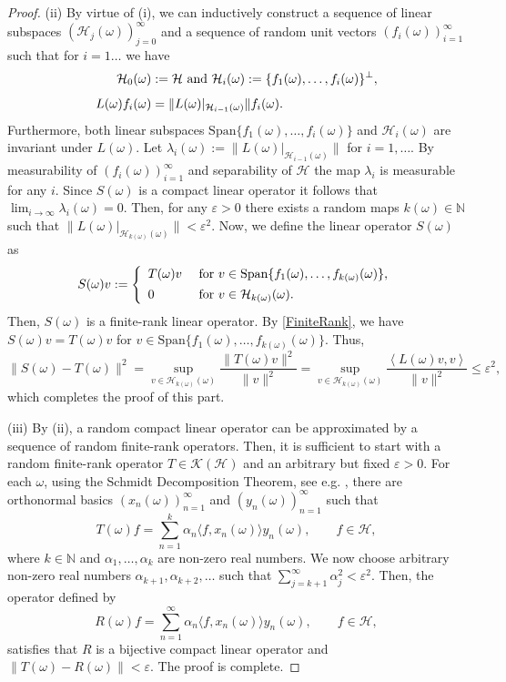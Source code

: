 \documentclass[pdflatex,sn-mathphys-num]{sn-jnl}%
\theoremstyle{thmstyleone}%
\theoremstyle{thmstyletwo}%
\theoremstyle{thmstylethree}%
\newcommand{\N}{\mathbb{N}}
\newcommand{\cH}{\mathcal{H}}
\newcommand{\eps}{\varepsilon}
\numberwithin{equation}{section}
\begin{document}
\begin{proof}
(ii) By virtue of (i), we can inductively construct a sequence of linear subspaces $(\cH_{j}(\omega))_{j=0}^{\infty}$ and a sequence of  random unit vectors $(f_i(\omega))_{i=1}^{\infty}$ such that for $i=1\dots$ we have 
\begin{align*}
\cH_{0}(\omega)&:=\cH \hbox{ and } \cH_i(\omega):=\{f_1(\omega),\dots, f_i(\omega)\}^{\perp},\\[1ex]
L(\omega)f_i(\omega)
&=
\|L(\omega)|_{\cH_{i-1}(\omega)}\|f_i(\omega).
\end{align*}
Furthermore, both linear subspaces $\mbox{Span}\{f_1(\omega),\dots, f_i(\omega)\}$ and $\cH_i(\omega)$ are invariant under $L(\omega)$. Let $\lambda_i(\omega):=\|L(\omega)|_{\cH_{i-1}(\omega)}\|$ for $i=1,\dots$. By measurability of  $(f_i(\omega))_{i=1}^{\infty}$ and separability of $\cH$ the map $\lambda_i$ is measurable for any $i$. Since $S(\omega)$ is a compact linear operator it follows that $\lim_{i\to\infty}\lambda_i(\omega)=0$. Then, for any $\eps>0$ there exists a random maps $k(\omega)\in \mathbb N$ such that $\|L(\omega)|_{\cH_{k(\omega)}(\omega)}\|<\eps^2$. Now, we define the linear operator $S(\omega)$ as 
\begin{equation}\label{FiniteRank}
S(\omega)v
:=
\left\{
\begin{array}{ll}
    T(\omega)v & \hbox{ for } v\in \mbox{Span}\{f_1(\omega),\dots, f_{k(\omega)}(\omega)\}, \\[1ex]
     0 & \hbox{ for } v\in \cH_{k(\omega)}(\omega).
\end{array}
\right.
\end{equation}
Then, $S(\omega)$ is a finite-rank linear operator. By \eqref{FiniteRank}, we have  $S(\omega)v=T(\omega)v$ for  $v\in \mbox{Span}\{f_1(\omega),\dots, f_{k(\omega)}(\omega)\}$. Thus,
\[
\|S(\omega)-T(\omega)\|^2=\sup_{v\in \cH_{k(\omega)}(\omega)}\frac{\|T(\omega)v\|^2}{\|v\|^2}=
\sup_{v\in \cH_{k(\omega)}(\omega)}\frac{\left\langle L(\omega)v,v\right\rangle}{\|v\|^2}\leq \eps^2,
\]
which completes the proof of this part.


(iii) By (ii), a random compact linear operator can be approximated by a sequence of random finite-rank operators. Then, it is sufficient to start with a random finite-rank operator $T\in\mathcal K(\mathcal H)$ and an arbitrary but fixed $\eps>0$. For each $\omega$, using the Schmidt Decomposition Theorem, see e.g. \cite[Theorem VIII. 8]{Retherford}, there are orthonormal basics $(x_n(\omega))_{n=1}^{\infty}$ and $(y_n(\omega))_{n=1}^{\infty}$ such that 
\[
T (\omega) f= \sum_{n=1}^{k}\alpha_n \langle f, x_n(\omega)\rangle y_n(\omega),\qquad f\in\mathcal H,
\] 
where $k\in\N$ and $\alpha_1,\dots,\alpha_k$ are non-zero real numbers. We now choose arbitrary non-zero real numbers $\alpha_{k+1},\alpha_{k+2},\dots$ such that $\sum_{j=k+1}^{\infty}\alpha_j^2<\eps^2$. Then, the operator defined by 
\[
R(\omega) f=\sum_{n=1}^{\infty}\alpha_n \langle f, x_n(\omega)\rangle y_n(\omega),\qquad f\in\mathcal H,
\] 
satisfies that $R$ is a bijective compact linear operator and $\|T(\omega)-R(\omega)\|<\eps$. The proof is complete.
\end{proof}
%
%
\end{document}

